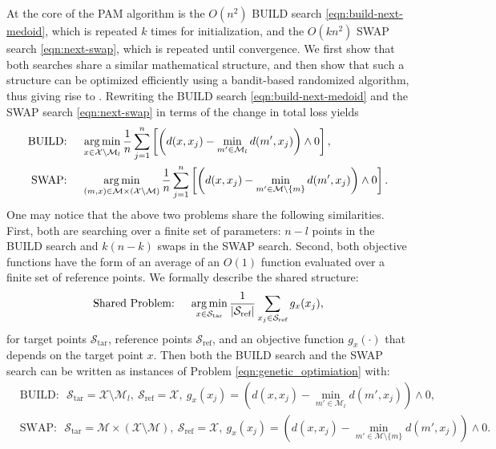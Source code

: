 
\section{\algnamenospace}
\label{sec:algo}

At the core of the PAM algorithm is the $O(n^2)$ BUILD search \eqref{eqn:build-next-medoid}, which is repeated $k$ times for initialization, and the $O(kn^2)$ SWAP search \eqref{eqn:next-swap}, which is repeated until convergence. 
We first show that both searches share a similar mathematical structure, and then show that such a structure can be optimized efficiently using a bandit-based randomized algorithm, thus giving rise to \algnamenospace. 
Rewriting the BUILD search \eqref{eqn:build-next-medoid} and the SWAP search \eqref{eqn:next-swap} in terms of the change in total loss yields
\begin{align}
    \text{BUILD:~~~~}& \operatorname*{arg\,min}_{x \in \mathcal{X} \setminus \mathcal{M}_{l}} \frac{1}{n} \sum_{j=1}^n \left[ \left(d(x, x_j) - \min_{m' \in \mathcal{M}_{l}} d(m', x_j) \right)  \wedge 0\right], \label{eqn:build_search}\\
    \text{SWAP:~~~~}& \operatorname*{arg\,min}_{(m,x) \in \mathcal{M} \times (\mathcal{X} \setminus \mathcal{M}) } \frac{1}{n} \sum_{j=1}^n \left[ \left(d(x, x_j) - \min_{m' \in \mathcal{M}\setminus \{m\}} d(m', x_j) \right)\wedge 0\right].  \label{eqn:swap_search}
\end{align}
One may notice that the above two problems share the following similarities.
First, both are searching over a finite set of parameters: $n-l$ points in the BUILD search and $k(n-k)$ swaps in the SWAP search. 
Second, both objective functions have the form of an average of an $O(1)$ function evaluated over a finite set of reference points. 
We formally describe the shared structure:
\begin{align} \label{eqn:genetic_optimiation}
    \text{Shared Problem:~~~~} \operatorname*{arg\,min}_{x \in \mathcal{S}_{\text{tar}} } \frac{1}{\vert \mathcal{S}_{\text{ref}} \vert } \sum_{x_j \in \mathcal{S}_{\text{ref}}} g_x(x_j), 
\end{align}
for target points $\mathcal{S}_{\text{tar}} $, reference points $\mathcal{S}_{\text{ref}}$, and an objective function $g_x(\cdot)$ that depends on the target point $x$. Then both the BUILD search and the SWAP search can be written as instances of Problem \eqref{eqn:genetic_optimiation} with:
\begin{align}
    & \text{BUILD:~~} 
    \mathcal{S}_{\text{tar}}=\mathcal{X} \setminus \mathcal{M}_{l},~
    \mathcal{S}_{\text{ref}} = \mathcal{X},~
    g_x(x_j) = \left(d(x, x_j) - \min_{m' \in \mathcal{M}_{l}} d(m', x_j) \right)  \wedge 0, \label{eqn:build_instance}\\
    & \text{SWAP:~~} 
    \mathcal{S}_{\text{tar}}=\mathcal{M} \times (\mathcal{X} \setminus \mathcal{M}),~
    \mathcal{S}_{\text{ref}} = \mathcal{X},~
    g_x(x_j) =  \left(d(x, x_j) - \min_{m' \in \mathcal{M} \setminus \{m\}} d(m', x_j) \right)\wedge 0. \label{eqn:swap_instance}
\end{align}
